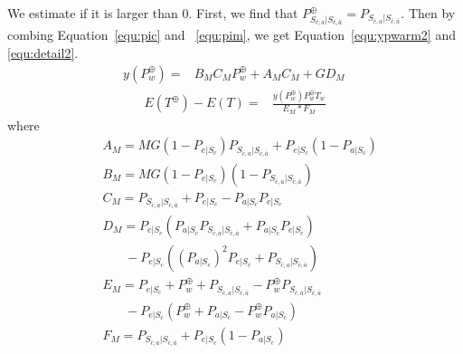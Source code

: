 We estimate if it is larger than $0$.
First, we find that $P_{S_{\bar{c}, a}|S_{\bar{c},\bar{a}}}^{\oplus} = P_{S_{\bar{c}, a}|S_{\bar{c},\bar{a}}}$.
Then by combing Equation~\ref{equ:pic} and ~\ref{equ:pim}, we get Equation~\ref{equ:ypwarm2} and \ref{equ:detail2}.
\begin{equation}
\label{equ:ypwarm2}
\begin{split}
y(P_{w}^{\oplus}) = &B_{M}C_{M}P_{w}^{\oplus}+A_{M}C_{M}+GD_{M} \,
\end{split}\end{equation}
\begin{equation}
\label{equ:detail2}
\begin{split}
E(T^{\oplus}) - E(T) = &\frac{y(P_{w}^{\oplus})P_{w}^{\oplus}T_{w}}{E_{M}*F_{M}}
\end{split}\end{equation}
where
\begin{equation*}
\begin{split}
&A_{M}= MG(1-P_{e|S_{c}})P_{S_{\bar{c}, a}|S_{\bar{c},\bar{a}}}+P_{e|S_{c}}(1-P_{a|S_{c}})\\
&B_{M}=MG(1-P_{e|S_{c}})(1-P_{S_{\bar{c}, a}|S_{\bar{c},\bar{a}}})\\
&C_{M}=P_{S_{\bar{c}, a}|S_{\bar{c},\bar{a}}}+P_{e|S_{c}}-P_{a|S_{c}}P_{e|S_{c}}\\
&D_{M}=P_{e|S_{c}}(P_{a|S_{c}}P_{S_{\bar{c}, a}|S_{\bar{c},\bar{a}}}+P_{a|S_{c}}P_{e|S_{c}}) \\
& \ \ \ \ \ \ \ \ -P_{e|S_{c}}((P_{a|S_{c}})^2P_{e|S_{c}}+P_{S_{\bar{c}, a}|S_{\bar{c},\bar{a}}})\\
&E_{M}=P_{e|S_{c}}+P_{w}^{\oplus}+P_{S_{\bar{c}, a}|S_{\bar{c},\bar{a}}}-P_{w}^{\oplus}P_{S_{\bar{c}, a}|S_{\bar{c},\bar{a}}} \\& \ \ \ \ \ \ \ \ -P_{e|S_{c}}(P_{w}^{\oplus}+P_{a|S_{c}}-P_{w}^{\oplus}P_{a|S_{c}})\\
&F_{M}=P_{S_{\bar{c}, a}|S_{\bar{c},\bar{a}}}+P_{e|S_{c}}(1-P_{a|S_{c}})
\end{split}\end{equation*}

